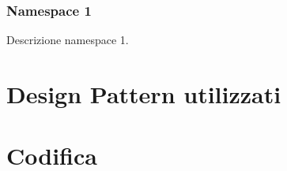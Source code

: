 \subsubsection{Namespace 1} %
Descrizione namespace 1.

\begin{namespacedesc}
\end{namespacedesc}


\section{Design Pattern utilizzati}

\section{Codifica}
